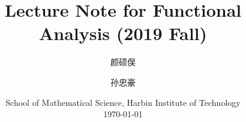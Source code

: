 \title{Lecture Note for Functional Analysis (2019 Fall)}
\author{颜硕俣 \and 孙忠豪}
\date{School of Mathematical Science, Harbin Institute of Technology \\ \today}
